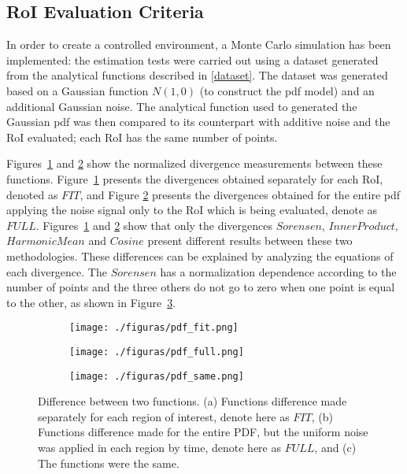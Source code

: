 \documentclass[conference]{IEEEtran}
\begin{document}
\subsection{RoI Evaluation Criteria}

In order to create a controlled environment, a Monte Carlo simulation has been implemented: the estimation tests were carried out using a dataset generated from the analytical functions described in \ref{dataset}.
The dataset was generated based on a Gaussian function $N(1,0)$ (to construct the pdf model) and an additional Gaussian noise. The analytical function used to generated the Gaussian pdf was then compared to its counterpart with additive noise and the RoI evaluated; each RoI has the same number of points. 


Figures~\ref{fig:06a} and \ref{fig:06b} show the normalized divergence measurements between these functions. Figure~\ref{fig:06a} presents the divergences obtained separately for each RoI, denoted as $FIT$, and  Figure \ref{fig:06b} presents the divergences obtained for the entire pdf applying the noise signal only to the RoI which is being evaluated, denote as $FULL$.
Figures~\ref{fig:06a} and \ref{fig:06b} show that only the divergences $Sorensen$, $InnerProduct$, $HarmonicMean$ and $Cosine$ present different results between these two methodologies.%
These differences can be explained by analyzing the equations of each divergence. The $Sorensen$ has a normalization dependence according to the number of points and the three others do not go to zero when one point is equal to the other, as shown in Figure~\ref{fig:06c}.


\begin{figure}[h!]
	
	\centering
	\begin{subfigure}{0.225\textwidth}
		\texttt{[image: ./figuras/pdf\_fit.png]}
		\caption{}
		\label{fig:06a}
	\end{subfigure}
	\begin{subfigure}{0.225\textwidth}
		\texttt{[image: ./figuras/pdf\_full.png]}
		\caption{}
		\label{fig:06b}
	\end{subfigure}
	\begin{subfigure}{0.225\textwidth}
		\texttt{[image: ./figuras/pdf\_same.png]}
		\caption{}
		\label{fig:06c}
	\end{subfigure}

	\caption{Difference between two functions. (a) Functions difference made separately for each region of interest, denote here as $FIT$, (b) Functions difference made for the entire PDF, but the uniform noise was applied in each region by time, denote here as $FULL$, and (c) The functions were the same.}
	\label{fig:06}
	
\end{figure}
\end{document}
